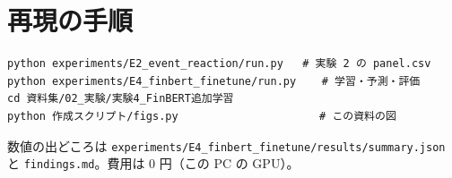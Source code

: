 \documentclass[xelatex,ja=standard,jafont=haranoaji,a4paper,10pt,openany]{bxjsreport}
\newcommand{\code}[1]{\texttt{#1}}
\begin{document}
\chapter*{再現の手順}

\begin{verbatim}
python experiments/E2_event_reaction/run.py   # 実験 2 の panel.csv
python experiments/E4_finbert_finetune/run.py    # 学習・予測・評価
cd 資料集/02_実験/実験4_FinBERT追加学習
python 作成スクリプト/figs.py                      # この資料の図
\end{verbatim}

数値の出どころは \code{experiments/E4\_finbert\_finetune/results/summary.json} と \code{findings.md}。費用は 0 円（この PC の GPU）。
\end{document}
